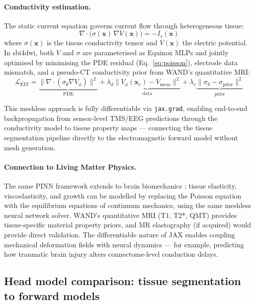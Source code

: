 \documentclass[11pt,a4paper]{article}\usepackage[]{graphicx}\usepackage[]{xcolor}
\begin{document}
\paragraph{Conductivity estimation.}
The static current equation governs current flow through heterogeneous
tissue:
%
\begin{equation}
  \nabla \cdot \bigl(\sigma(\mathbf{x})\,\nabla V(\mathbf{x})\bigr) = -I_s(\mathbf{x})
  \label{eq:poisson}
\end{equation}
%
where $\sigma(\mathbf{x})$ is the tissue conductivity tensor and
$V(\mathbf{x})$ the electric potential. In sbi4dwi, both $V$ and
$\sigma$ are parameterised as Equinox MLPs and jointly optimised by
minimising the PDE residual (Eq.~\ref{eq:poisson}), electrode data
mismatch, and a pseudo-CT conductivity prior from WAND's quantitative
MRI:
%
\begin{equation}
  \mathcal{L}_\text{EIT} = \underbrace{\|\nabla\cdot(\sigma_\theta\nabla V_\phi)\|^2}_{\text{PDE}}
    + \lambda_d \underbrace{\|V_\phi(\mathbf{x}_e) - V_\text{meas}\|^2}_{\text{data}}
    + \lambda_r \underbrace{\|\sigma_\theta - \sigma_\text{prior}\|^2}_{\text{prior}}
\end{equation}

This meshless approach is fully differentiable via
\texttt{jax.grad}, enabling end-to-end backpropagation from
sensor-level TMS/EEG predictions through the conductivity model to
tissue property maps --- connecting the tissue segmentation pipeline
directly to the electromagnetic forward model without mesh generation.

\paragraph{Connection to Living Matter Physics.}
The same PINN framework extends to brain biomechanics
\citep{Kuhl2024livingmatter}: tissue elasticity, viscoelasticity, and
growth can be modelled by replacing the Poisson equation with the
equilibrium equations of continuum mechanics, using the same meshless
neural network solver. WAND's quantitative MRI (T1, T2*, QMT) provides
tissue-specific material property priors, and MR elastography (if
acquired) would provide direct validation. The differentiable nature of
JAX enables coupling mechanical deformation fields with neural dynamics
--- for example, predicting how traumatic brain injury alters
connectome-level conduction delays.

\subsection{Head model comparison: tissue segmentation to forward models}
\end{document}

